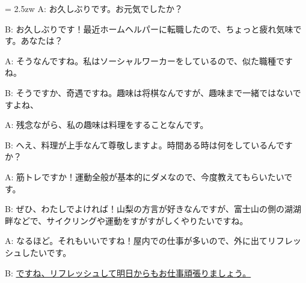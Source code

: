 \documentclass[11pt]{amsart}
\title{}
\author{}
\newenvironment{hangall}[1]{\hangindent = 2.5zw\everypar{\hangindent = 2.5zw}}{}
\begin{document}
\maketitle
\begin{hangall}{}%
A: お久しぶりです。お元気でしたか？

B: お久しぶりです！最近ホームヘルパーに転職したので、ちょっと疲れ気味です。あなたは？

A: そうなんですね。私はソーシャルワーカーをしているので、似た職種ですね。

B: そうですか、奇遇ですね。趣味は将棋なんですが、趣味まで一緒ではないですよね、

A: 残念ながら、私の趣味は料理をすることなんです。

B: へえ、料理が上手なんて尊敬しますよ。時間ある時は何をしているんですか？

A: 筋トレですか！運動全般が基本的にダメなので、今度教えてもらいたいです。

B: ぜひ、わたしでよければ！山梨の方言が好きなんですが、富士山の側の湖湖畔などで、サイクリングや運動をすがすがしくやりたいですね。

A: なるほど。それもいいですね！屋内での仕事が多いので、外に出てリフレッシュしたいです。

B: \ul{ですね、リフレッシュして明日からもお仕事頑張りましょう。}\end{hangall}
\end{document}
